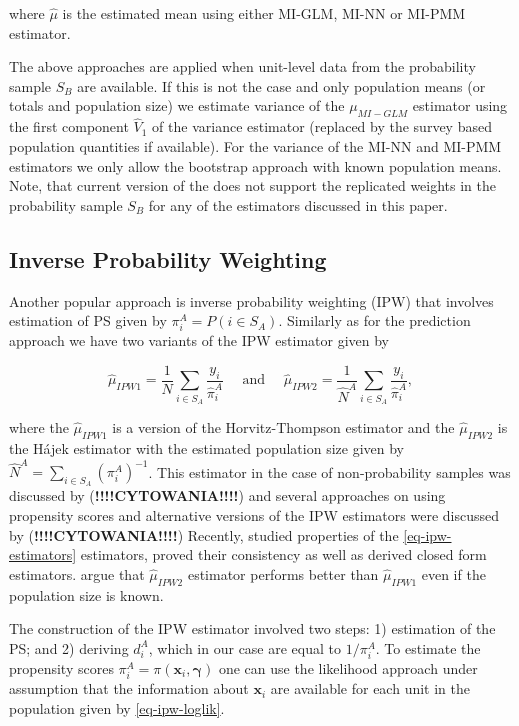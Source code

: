 \documentclass[
]{jss}
\begin{document}
where \(\hat{\mu}\) is the estimated mean using either MI-GLM, MI-NN or
MI-PMM estimator.

The above approaches are applied when unit-level data from the
probability sample \(S_B\) are available. If this is not the case and
only population means (or totals and population size) we estimate
variance of the \(\mu_{MI-GLM}\) estimator using the first component
\(\hat{V}_1\) of the \citet{kim_combining_2021} variance estimator
(replaced by the survey based population quantities if available). For
the variance of the MI-NN and MI-PMM estimators we only allow the
bootstrap approach with known population means. Note, that current
version of the  does not support the replicated weights
in the probability sample \(S_B\) for any of the estimators discussed in
this paper.

\subsection{Inverse Probability Weighting}\label{sec-ipw}

Another popular approach is inverse probability weighting (IPW) that
involves estimation of PS given by \(\pi_i^A=P\left(i \in S_A \right)\).
Similarly as for the prediction approach we have two variants of the IPW
estimator given by

\begin{equation}
\hat{\mu}_{IPW1}=\frac{1}{N} \sum_{i \in S_A} \frac{y_i}{\hat{\pi}_i^A} \quad \text { and } \quad \hat{\mu}_{IPW2}=\frac{1}{\hat{N}^A} \sum_{i \in S_A} \frac{y_i}{\hat{\pi}_i^A},
\label{eq-ipw-estimators}
\end{equation}

where the \(\hat{\mu}_{IPW1}\) is a version of the Horvitz-Thompson
estimator and the \(\hat{\mu}_{IPW2}\) is the Hájek estimator with the
estimated population size given by
\(\hat{N}^A = \sum_{i \in S_A} (\pi_i^A)^{-1}\). This estimator in the
case of non-probability samples was discussed by
(\textbf{!!!!CYTOWANIA!!!!}) and several approaches on using propensity
scores and alternative versions of the IPW estimators were discussed by
(\textbf{!!!!CYTOWANIA!!!!}) Recently, \citet{chen2020doubly} studied
properties of the \eqref{eq-ipw-estimators} estimators, proved their
consistency as well as derived closed form estimators.
\citet[section 4.2]{wu2022statistical} argue that \(\hat{\mu}_{IPW2}\)
estimator performs better than \(\hat{\mu}_{IPW1}\) even if the
population size is known.

The construction of the IPW estimator involved two steps: 1) estimation
of the PS; and 2) deriving \(d_i^A\), which in our case are equal to
\(1/\pi_i^A\). To estimate the propensity scores
\(\pi_i^A=\pi(\boldsymbol{x}_i, \boldsymbol{\gamma})\) one can use the
likelihood approach under assumption that the information about
\(\boldsymbol{x}_i\) are available for each unit in the population given
by \eqref{eq-ipw-loglik}.
\end{document}

